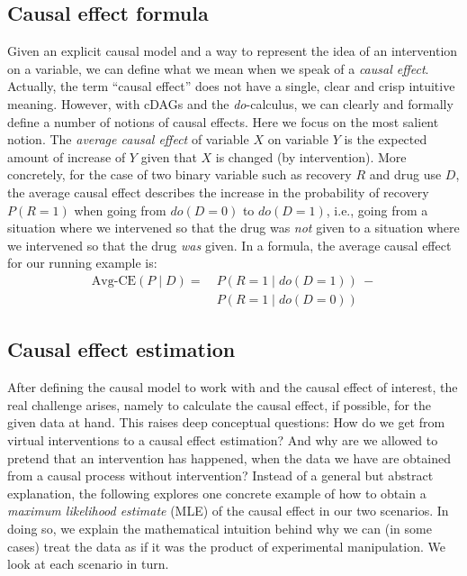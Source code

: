 \documentclass[nobib]{tufte-handout}
\newcommand{\docalc}{\emph{do}-calculus\xspace}
\newcommand{\mathdo}{\mathit{do}}
\begin{document}
\subsection{Causal effect formula} \label{sec:causal-effect-formula}

Given an explicit causal model and a way to represent the idea of an intervention on a variable, we can define what we mean when we speak of a \textit{causal effect}.
Actually, the term ``causal effect'' does not have a single, clear and crisp intuitive meaning.
However, with cDAGs and the \docalc, we can clearly and formally define a number of notions of causal effects.
Here we focus on the most salient notion.
The \textit{average causal effect} of variable $X$ on variable $Y$ is the expected amount of increase of $Y$ given that $X$ is changed (by intervention).
More concretely, for the case of two binary variable such as recovery $R$ and drug use $D$, the average causal effect describes the increase in the probability of recovery $P(R = 1)$ when going from $\mathdo(D=0)$ to $\mathdo(D=1)$, i.e., going from a situation where we intervened so that the drug was \textit{not} given to a situation where we intervened so that the drug \textit{was} given.
In a formula, the average causal effect for our running example is:
\begin{align*}
  \text{Avg-CE}(P \mid D) = & \ P(R=1 \mid \mathdo(D=1)) \  -
                        \\ & \ P(R=1 \mid \mathdo(D=0))
\end{align*}


\subsection{Causal effect estimation} \label{sec:causal-effect}

After defining the causal model to work with and the causal effect of interest, the real challenge arises, namely to calculate the causal effect, if possible, for the given data at hand.
This raises deep conceptual questions:
How do we get from virtual interventions to a causal effect estimation?
And why are we allowed to pretend that an intervention has happened, when the data we have are obtained from a causal process without intervention?
Instead of a general but abstract explanation, the following explores one concrete example of how to obtain a \textit{maximum likelihood estimate} (MLE) of the causal effect in our two scenarios.
In doing so, we explain the mathematical intuition behind why we can (in some cases) treat the data as if it was the product of experimental manipulation.
We look at each scenario in turn.
\end{document}
